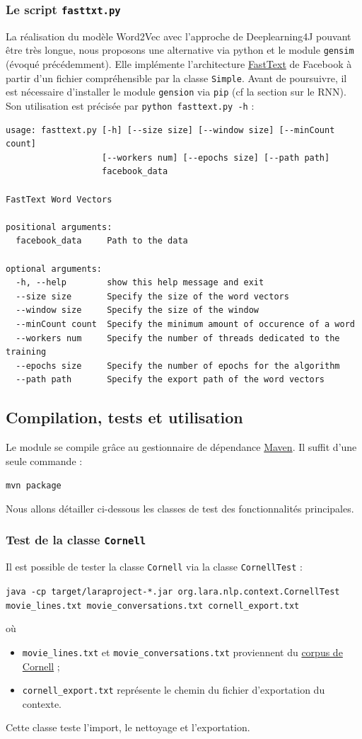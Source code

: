 \documentclass[10pt,a4paper]{article}
\begin{document}
\subsubsection{Le script \texttt{fasttxt.py}}
La réalisation du modèle Word2Vec avec l'approche de Deeplearning4J pouvant être très longue, nous proposons une alternative via python et le module \texttt{gensim} (évoqué précédemment). Elle implémente l'architecture \href{https://fasttext.cc/}{FastText} de Facebook à partir d'un fichier compréhensible par la classe \texttt{Simple}. Avant de poursuivre, il est nécessaire d'installer le module \texttt{gension} via \texttt{pip} (cf la section sur le RNN). Son utilisation est précisée par \texttt{python fasttext.py -h} :
\begin{verbatim}
usage: fasttext.py [-h] [--size size] [--window size] [--minCount count]
                   [--workers num] [--epochs size] [--path path]
                   facebook_data

FastText Word Vectors

positional arguments:
  facebook_data     Path to the data

optional arguments:
  -h, --help        show this help message and exit
  --size size       Specify the size of the word vectors
  --window size     Specify the size of the window
  --minCount count  Specify the minimum amount of occurence of a word
  --workers num     Specify the number of threads dedicated to the training
  --epochs size     Specify the number of epochs for the algorithm
  --path path       Specify the export path of the word vectors
\end{verbatim}
\subsection{Compilation, tests et utilisation}
Le module se compile grâce au gestionnaire de dépendance \href{https://maven.apache.org/}{Maven}. Il suffit d'une seule commande :
\begin{center}
\texttt{mvn package}
\end{center}
Nous allons détailler ci-dessous les classes de test des fonctionnalités principales.
\subsubsection{Test de la classe \texttt{Cornell}}
Il est possible de tester la classe \texttt{Cornell} via la classe \texttt{CornellTest} :
\begin{center}
\texttt{java -cp target/laraproject-*.jar org.lara.nlp.context.CornellTest movie\_lines.txt movie\_conversations.txt cornell\_export.txt}
\end{center}
où
\begin{itemize}
\item \texttt{movie\_lines.txt} et \texttt{movie\_conversations.txt} proviennent du \href{https://www.cs.cornell.edu/~cristian/Cornell_Movie-Dialogs_Corpus.html}{corpus de Cornell} ;
\item \texttt{cornell\_export.txt} représente le chemin du fichier d'exportation du contexte.
\end{itemize}
Cette classe teste l'import, le nettoyage et l'exportation.
\end{document}
